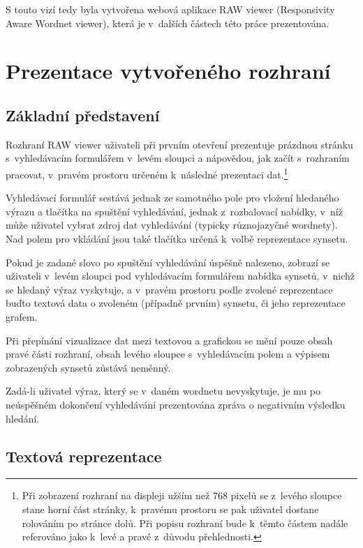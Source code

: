 \documentclass[a4paper,11pt,openany,twoside]{book}
\newcommand{\simplywn}{RAW viewer }
\begin{document}
				S touto vizí tedy byla vytvořena webová aplikace \simplywn (Responsivity Aware Wordnet viewer), která je v~dalších částech této práce prezentována.

		\chapter{Prezentace vytvořeného rozhraní}
		\label{cha:ui}

			\section{Základní představení}

				Rozhraní \simplywn uživateli při prvním otevření prezentuje prázdnou stránku s~vyhledávacím formulářem v~levém sloupci a nápovědou, jak začít s~rozhraním pracovat, v~pravém prostoru určeném k~následné prezentaci dat.\footnote{Při zobrazení rozhraní na displeji užším než 768 pixelů se z~levého sloupce stane horní část stránky, k~pravému prostoru se pak uživatel dostane rolováním po stránce dolů. Při popisu rozhraní bude k~těmto částem nadále referováno jako k~levé a pravé z~důvodu přehlednosti.}

				Vyhledávací formulář sestává jednak ze samotného pole pro vložení hledaného výrazu a tlačítka na spuštění vyhledávání, jednak z~rozbalovací nabídky, v~níž může uživatel vybrat zdroj dat vyhledávání (typicky různojazyčné wordnety). Nad polem pro vkládání jsou také tlačítka určená k~volbě reprezentace synsetu.

				Pokud je zadané slovo po spuštění vyhledávání úspěšně nalezeno, zobrazí se uživateli v~levém sloupci pod vyhledávacím formulářem nabídka synsetů, v~nichž se hledaný výraz vyskytuje, a v~pravém prostoru podle zvolené reprezentace buďto textová data o zvoleném (případně prvním) synsetu, či jeho reprezentace grafem.

				Při přepínání vizualizace dat mezi textovou a grafickou se mění pouze obsah pravé části rozhraní, obsah levého sloupce s~vyhledávacím polem a výpisem zobrazených synsetů zůstává neměnný.

				Zadá-li uživatel výraz, který se v~daném wordnetu nevyskytuje, je mu po neúspěšném dokončení vyhledávání prezentována zpráva o negativním výsledku hledání. 

			\section{Textová reprezentace}
			\label{cha:textovarepres}
\end{document}
